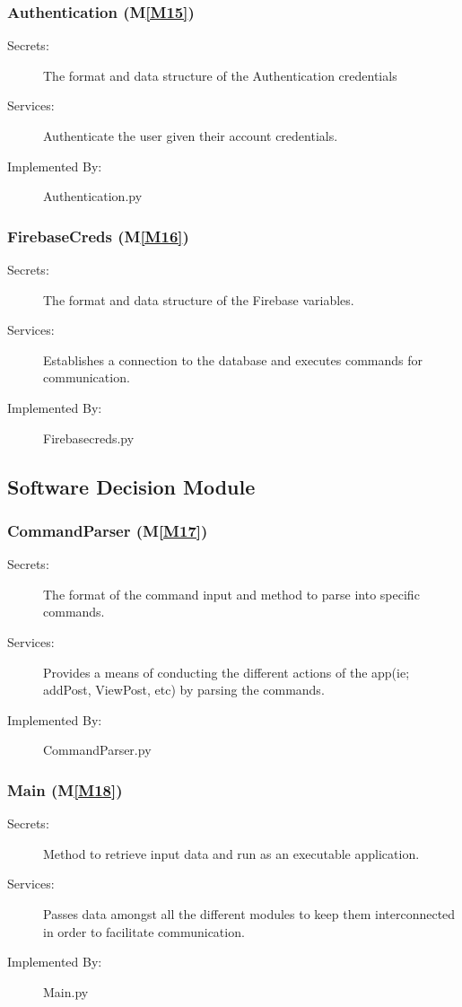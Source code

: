\documentclass[12pt, titlepage]{article}
\newcommand{\mref}[1]{M\ref{#1}}
\begin{document}
\subsubsection{Authentication (\mref{M15})}
\begin{description}
\item[Secrets:] The format and data structure of the Authentication credentials
\item[Services:] Authenticate the user given their account credentials.
\item[Implemented By:] Authentication.py
\end{description}

\subsubsection{FirebaseCreds (\mref{M16})}
\begin{description}
\item[Secrets:] The format and data structure of the Firebase variables.
\item[Services:] Establishes a connection to the database and executes commands for communication.
\item[Implemented By:] Firebasecreds.py
\end{description}


\subsection{Software Decision Module}
\subsubsection{CommandParser (\mref{M17})}
\begin{description}
\item[Secrets:] The format of the command input and method to parse into specific commands.
\item[Services:] Provides a means of conducting the different actions of the app(ie; addPost, ViewPost, etc) by parsing the commands.
\item[Implemented By:] CommandParser.py
\end{description}

\subsubsection{Main (\mref{M18})}
\begin{description}
\item[Secrets:] Method to retrieve input data and run as an executable application.
\item[Services:] Passes data amongst all the different modules to keep them interconnected in order to facilitate communication.
\item[Implemented By:] Main.py
\end{description}
\end{document}
